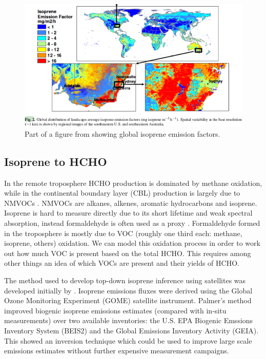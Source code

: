     
    \begin{figure}
      \includegraphics{Figures/MeganIsoprene1.png}
      \caption{ Part of a figure from \citet{Guenther2006} showing global isoprene emission factors. }
      \label{ch_LitRev:fig:meganisoprene}
    \end{figure}
    
  \subsection{Isoprene to HCHO}
    \label{ch_LitRev:sec:IsopFromHCHO}
    In the remote troposphere HCHO production is dominated by methane oxidation, while in the continental boundary layer (CBL) production is largely due to NMVOCs \citep{Abbot2003, Kefauver2014}.
    NMVOCs are alkanes, alkenes, aromatic hydrocarbons and isoprene.
    Isoprene is hard to measure directly due to its short lifetime and weak spectral absorption, instead formaldehyde is often used as a proxy \citep{Millet2006, Fu2007, Dufour2009, Marais2012, bauwens2013satellite, Kefauver2014, Bauwens2016}.
    Formaldehyde formed in the troposphere is mostly due to VOC (roughly one third each: methane, isoprene, others) oxidation.
    We can model this oxidation process in order to work out how much VOC is present based on the total HCHO.
    This requires among other things an idea of which VOCs are present and their yields of HCHO.
    
    The method used to develop top-down isoprene inference using satellites was developed initially by \citet{Palmer2001, Palmer2003}. 
    Isoprene emissions fluxes were derived using the Global Ozone Monitoring Experiment (GOME) satellite instrument.
    Palmer's method improved biogenic isoprene emissions estimates (compared with in-situ measurements) over two available inventories: the U.S. EPA Biogenic Emssions Inventory System (BEIS2) and the Global Emissions Inventory Activity (GEIA).
    This showed an inversion technique which could be used to improve large scale emissions estimates without further expensive measurement campaigns.
    
